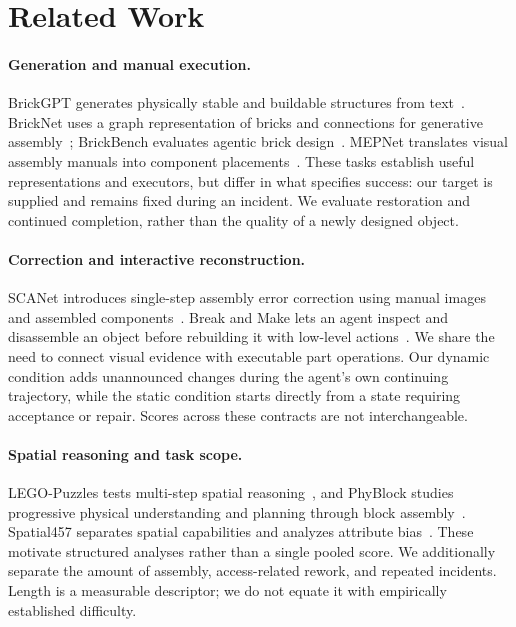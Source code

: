 \documentclass[10pt,twocolumn,letterpaper]{article}
\begin{document}
\section{Related Work}
\paragraph{Generation and manual execution.}
BrickGPT generates physically stable and buildable structures from text~\cite{pun2025brickgpt}. BrickNet uses a graph representation of bricks and connections for generative assembly~\cite{kulits2026bricknet}; BrickBench evaluates agentic brick design~\cite{kulits2026brickbench}. MEPNet translates visual assembly manuals into component placements~\cite{wang2022mepnet}. These tasks establish useful representations and executors, but differ in what specifies success: our target is supplied and remains fixed during an incident. We evaluate restoration and continued completion, rather than the quality of a newly designed object.

\paragraph{Correction and interactive reconstruction.}
SCANet introduces single-step assembly error correction using manual images and assembled components~\cite{wan2024scanet}. Break and Make lets an agent inspect and disassemble an object before rebuilding it with low-level actions~\cite{walsman2022breakmake}. We share the need to connect visual evidence with executable part operations. Our dynamic condition adds unannounced changes during the agent's own continuing trajectory, while the static condition starts directly from a state requiring acceptance or repair. Scores across these contracts are not interchangeable.

\paragraph{Spatial reasoning and task scope.}
LEGO-Puzzles tests multi-step spatial reasoning~\cite{tang2025legopuzzles}, and PhyBlock studies progressive physical understanding and planning through block assembly~\cite{ma2025phyblock}. Spatial457 separates spatial capabilities and analyzes attribute bias~\cite{wang2025spatial457}. These motivate structured analyses rather than a single pooled score. We additionally separate the amount of assembly, access-related rework, and repeated incidents. Length is a measurable descriptor; we do not equate it with empirically established difficulty.
\end{document}
